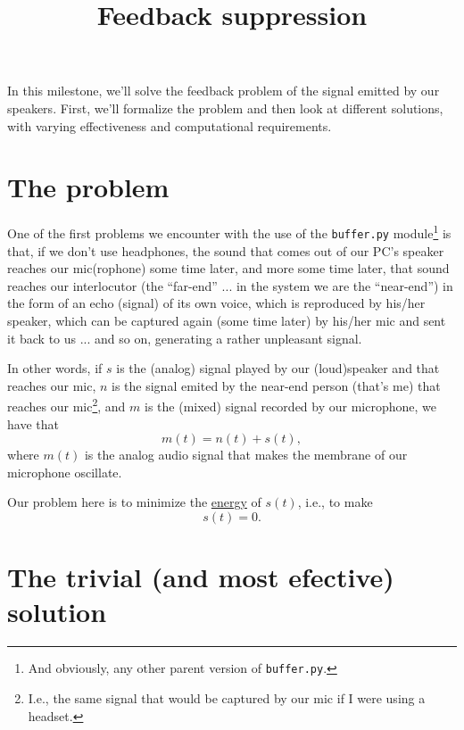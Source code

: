 
\title{Feedback suppression}

\maketitle

In this milestone, we'll solve the feedback problem of the signal
emitted by our speakers. First, we'll formalize the problem and then
look at different solutions, with varying effectiveness and
computational requirements.

\section{The problem}

One of the first problems we encounter with the use of the
\texttt{buffer.py} module\footnote{And obviously, any other parent
  version of \texttt{buffer.py}.} is that, if we don't use headphones,
the sound that comes out of our PC's speaker reaches our mic(rophone)
some time later, and more some time later, that sound reaches our
interlocutor (the ``far-end'' ... in the system we are the
``near-end'') in the form of an echo (signal) of its own voice, which
is reproduced by his/her speaker, which can be captured again (some
time later) by his/her mic and sent it back to us ... and so on,
generating a rather unpleasant signal.

In other words, if
$s$ is the (analog) signal played by our (loud)speaker and
that reaches our mic, $n$ is the signal emited by the
near-end person (that's me) that reaches our mic\footnote{I.e., the same
  signal that would be captured by our mic if I were using a
  headset.}, and $m$ is the (mixed) signal recorded by our
microphone, we have that
\begin{equation}
  m(t) = n(t) + s(t),
  \label{eq:echo_problem}
\end{equation}
where $m(t)$ is the analog audio signal that makes the membrane of our
microphone oscillate.

Our problem here is to minimize the
\href{https://en.wikipedia.org/wiki/Energy_(signal_processing)}{energy}
of $s(t)$, i.e., to make
\begin{equation}
  s(t) = 0.
\end{equation}

\section{The trivial (and most efective) solution}

